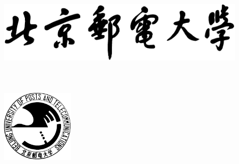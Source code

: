 \begin{titlepage}
    \centering    
    \begin{spacing}{1.05}
            \quad{}\vspace{8mm}
            \yihao \quad{} \\
            \includegraphics[width=12cm]{inc/buptname}\\
            \yihao \quad{} \\
             \\ %
            \yihao \quad{} \\
	    \includegraphics[width=3.5cm]{inc/buptseal}\\
            \wuhao \quad{} \\
            \parbox[c]{.7\textwidth}{%
                } \\%
            \sanhao \quad{}
            \vspace{5mm}
        \end{spacing}
        \begin{spacing}{1.6}
             \\
             \\
             \\
             \\
             \\
             \\
        \end{spacing}
        \begin{spacing}{1.05}
            \sanhao\quad{} \\ \wuhao\quad{} \\
            \vspace{5mm}
            \coverdatefont{\date}
        \end{spacing}
\end{titlepage}
